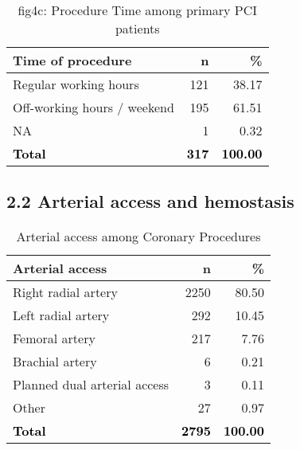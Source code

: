 \documentclass[
]{article}
\begin{document}
\begin{longtable}[t]{lrr}
\caption{\label{tab:table 17}fig4c: Procedure Time among primary PCI patients}\\
\toprule
Time of procedure & n & \%\\
\midrule
Regular working hours & 121 & 38.17\\
Off-working hours / weekend & 195 & 61.51\\
NA & 1 & 0.32\\
\textcolor{black}{\textbf{Total}} & \textcolor{black}{\textbf{317}} & \textcolor{black}{\textbf{100.00}}\\
\bottomrule
\end{longtable}

\hypertarget{arterial-access-and-hemostasis}{%
\subsection{2.2 Arterial access and
hemostasis}\label{arterial-access-and-hemostasis}}

\begin{longtable}[t]{lrr}
\caption{\label{tab:table 18}Arterial access among Coronary Procedures}\\
\toprule
Arterial access & n & \%\\
\midrule
Right radial artery & 2250 & 80.50\\
Left radial artery & 292 & 10.45\\
Femoral artery & 217 & 7.76\\
Brachial artery & 6 & 0.21\\
Planned dual arterial access & 3 & 0.11\\
\addlinespace
Other & 27 & 0.97\\
\textcolor{black}{\textbf{Total}} & \textcolor{black}{\textbf{2795}} & \textcolor{black}{\textbf{100.00}}\\
\bottomrule
\end{longtable}
\end{document}
